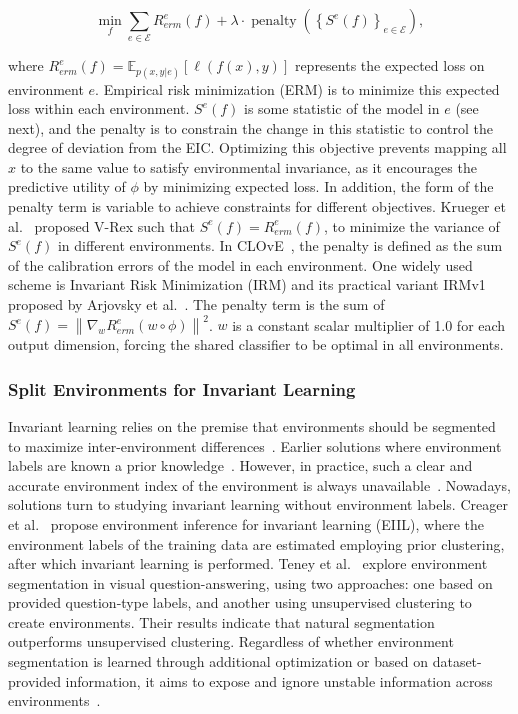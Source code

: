\begin{equation}
\min _f\sum_{e \in \mathcal{E}} R^e_{erm}(f)+\lambda \cdot \operatorname{penalty}\left(\left\{S^e(f)\right\}_{e \in \mathcal{E}}\right),
\end{equation}

where $R^e_{erm}(f) = \mathbb{E}_{p(x,y|e)}[\ell(f(x),y)]$ represents the expected loss on environment $e$. Empirical risk minimization (ERM) is to minimize this expected loss within each environment. $S^e(f)$ is some statistic of the model in $e$ (see next), and the penalty is to constrain the change in this statistic to control the degree of deviation from the EIC. Optimizing this objective prevents mapping all $x$ to the same value to satisfy environmental invariance, as it encourages the predictive utility of $\phi$ by minimizing expected loss. In addition, the form of the penalty term is variable to achieve constraints for different objectives. Krueger et al.~\cite{v-rex} proposed V-Rex such that $S^e(f)=R^e_{erm}(f)$, to minimize the variance of $S^e(f)$ in different environments. In CLOvE~\cite{causal_ir}, the penalty is defined as the sum of the calibration errors of the model in each environment. One widely used scheme is Invariant Risk Minimization (IRM) and its practical variant IRMv1 proposed by Arjovsky et al.~\cite{IRM_training}. The penalty term is the sum of $S^e(f)=\left\|\nabla_w R^e_{erm}(w \circ \phi)\right\|^2$. $w$ is a constant scalar multiplier of 1.0 for each output dimension, forcing the shared classifier to be optimal in all environments. 

\subsubsection{Split Environments for Invariant Learning}
Invariant learning relies on the premise that environments should be segmented to maximize inter-environment differences~\cite{IR_intro}. Earlier solutions where environment labels are known a prior knowledge~\cite{bottleneck_ir, empirical_ir}. However, in practice, such a clear and accurate environment index of the environment is always unavailable~\cite{environment_label,inaccessible_label_2}. Nowadays, solutions turn to studying invariant learning without environment labels. Creager et al.~\cite{EIC} propose environment inference for invariant learning (EIIL), where the environment labels of the training data are estimated employing prior clustering, after which invariant learning is performed. Teney et al.~\cite{unshuffling} explore environment segmentation in visual question-answering, using two approaches: one based on provided question-type labels, and another using unsupervised clustering to create environments. Their results indicate that natural segmentation outperforms unsupervised clustering. Regardless of whether environment segmentation is learned through additional optimization or based on dataset-provided information, it aims to expose and ignore unstable information across environments~\cite{IR_intro}. 